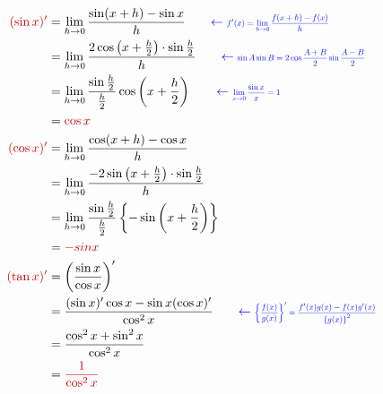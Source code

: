 \documentclass[../main]{subfiles}
\begin{document}
\begin{align}
    \EmLight{(\sin x)'} &= \lim_{h\to 0}\frac{\sin(x+h)-\sin x}{h}
    \qquad \ExprNote{f'(x) = \lim_{h\to 0}\frac{f(x+h)-f(x)}{h}} \\
    &= \lim_{h\to 0}\frac{2\cos\left(x+\frac{h}{2}\right)\cdot\sin\frac{h}{2}}{h}
    \qquad \ExprNote{\sin A\sin B = 2\cos\frac{A+B}{2}\sin\frac{A-B}{2}} \\
    &= \lim_{h\to 0}\frac{\sin\frac{h}{2}}{\frac{h}{2}}\cos\left(x+\frac{h}{2}\right)
    \qquad \ExprNote{\lim_{x\to 0}\frac{\sin x}{x} = 1} \\
    &= \EmLight{\cos x} \\
    \EmLight{(\cos x)'} &= \lim_{h\to 0}\frac{\cos(x+h)-\cos x}{h} \\
    &= \lim_{h\to 0}\frac{-2\sin\left(x+\frac{h}{2}\right)\cdot\sin\frac{h}{2}}{h} \\
    &= \lim_{h\to 0}\frac{\sin\frac{h}{2}}{\frac{h}{2}}
    \left\{-\sin\left(x+\frac{h}{2}\right)\right\} \\
    &= \EmLight{-sin x} \\
    \EmLight{(\tan x)'} &= \left(\frac{\sin x}{\cos x}\right)' \\
    &= \frac{(\sin x)'\cos x - \sin x(\cos x)'}{\cos^2 x}
    \qquad \ExprNote{
        \left\{
            \frac{f(x)}{g(x)}
        \right\}' = \frac{f'(x)g(x)-f(x)g'(x)}
        {\left\{g(x)\right\}^2}
    } \\
    &= \frac{\cos^2 x + \sin^2 x}{\cos^2 x} \\
    &= \EmLight{\frac{1}{\cos^2 x}}
\end{align}
\end{document}
